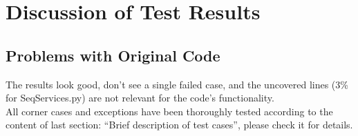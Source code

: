 \documentclass[12pt]{article}
\begin{document}
\section{Discussion of Test Results}

\subsection{Problems with Original Code}
The results look good, don’t see a single failed case, and the uncovered lines (3\% for SeqServices.py) are not relevant for the code's functionality.\\
All corner cases and exceptions have been thoroughly tested according to the content of last section: “Brief description of test cases”, please check it for details.\\
\\
\end{document}
